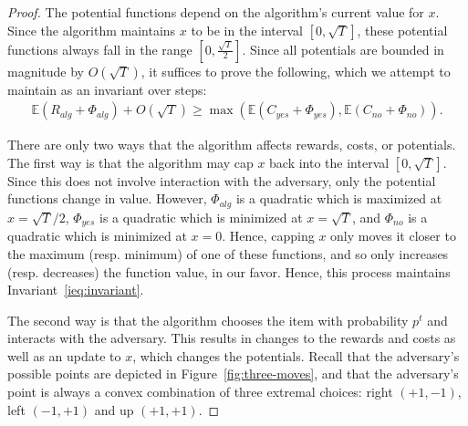 \documentclass[final,12pt]{colt2018}
\newcommand{\E}{\mathbb{E}}
\newcommand{\RewardAlg}{R_{alg}}
\newcommand{\CostYes}{C_{yes}}
\newcommand{\CostNo}{C_{no}}
\newcommand{\Potential}{\Phi}
\newcommand{\PotentialAlg}{\Potential_{alg}}
\newcommand{\PotentialYes}{\Potential_{yes}}
\newcommand{\PotentialNo}{\Potential_{no}}
\begin{document}
\begin{proof}
  The potential functions depend on the algorithm's current value for $x$. Since the algorithm maintains $x$ to be in the interval $[0, \sqrt{T}]$, these potential functions always fall in the range $[0, \frac{\sqrt{T}}{2}]$. Since all potentials are bounded in magnitude by $O(\sqrt{T})$, it suffices to prove the following, which we attempt to maintain as an invariant over steps:
  \begin{align}
    \E (\RewardAlg + \PotentialAlg) + O(\sqrt{T})
      \ge \max \left( \E (\CostYes + \PotentialYes), \E (\CostNo + \PotentialNo) \right). \label{ieq:invariant}
  \end{align}
  
  There are only two ways that the algorithm affects rewards, costs, or
  potentials. The first way is that the algorithm may cap $x$ back into the
  interval $[0, \sqrt{T}]$. Since this does not involve interaction with the
  adversary, only the potential functions change in value. However,
  $\PotentialAlg$ is a quadratic which is maximized at $x = \sqrt{T}/2$,
  $\PotentialYes$ is a quadratic which is minimized at $x = \sqrt{T}$, and
  $\PotentialNo$ is a quadratic which is minimized at $x = 0$. Hence, capping
  $x$ only moves it closer to the maximum (resp. minimum) of one of these
  functions, and so only increases (resp. decreases) the function value, in our
  favor. Hence, this process maintains Invariant~\ref{ieq:invariant}.
  
  The second way is that the algorithm chooses the item with probability $p^t$
  and interacts with the adversary. This results in changes to the rewards and
  costs as well as an update to $x$, which changes the potentials. Recall that
  the adversary's possible points are depicted in Figure~\ref{fig:three-moves},
  and that the adversary's point is always a convex combination of three
  extremal choices: right $(+1, -1)$, left $(-1, +1)$ and up $(+1, +1)$.
  

\end{proof}
\end{document}
